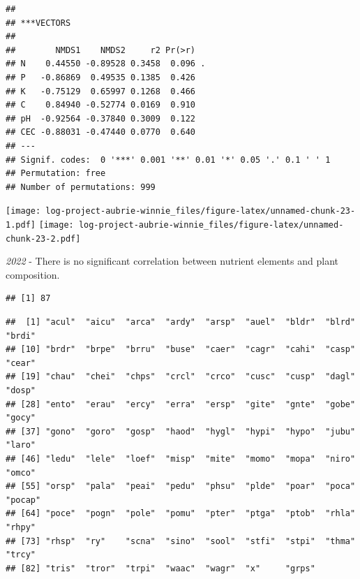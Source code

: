 \documentclass[
]{article}
\begin{document}
\begin{verbatim}
## 
## ***VECTORS
## 
##        NMDS1    NMDS2     r2 Pr(>r)  
## N    0.44550 -0.89528 0.3458  0.096 .
## P   -0.86869  0.49535 0.1385  0.426  
## K   -0.75129  0.65997 0.1268  0.466  
## C    0.84940 -0.52774 0.0169  0.910  
## pH  -0.92564 -0.37840 0.3009  0.122  
## CEC -0.88031 -0.47440 0.0770  0.640  
## ---
## Signif. codes:  0 '***' 0.001 '**' 0.01 '*' 0.05 '.' 0.1 ' ' 1
## Permutation: free
## Number of permutations: 999
\end{verbatim}

\texttt{[image: log-project-aubrie-winnie\_files/figure-latex/unnamed-chunk-23-1.pdf]}
\texttt{[image: log-project-aubrie-winnie\_files/figure-latex/unnamed-chunk-23-2.pdf]}

\emph{2022} - There is no significant correlation between nutrient
elements and plant composition.

\begin{verbatim}
## [1] 87
\end{verbatim}

\begin{verbatim}
##  [1] "acul"  "aicu"  "arca"  "ardy"  "arsp"  "auel"  "bldr"  "blrd"  "brdi" 
## [10] "brdr"  "brpe"  "brru"  "buse"  "caer"  "cagr"  "cahi"  "casp"  "cear" 
## [19] "chau"  "chei"  "chps"  "crcl"  "crco"  "cusc"  "cusp"  "dagl"  "dosp" 
## [28] "ento"  "erau"  "ercy"  "erra"  "ersp"  "gite"  "gnte"  "gobe"  "gocy" 
## [37] "gono"  "goro"  "gosp"  "haod"  "hygl"  "hypi"  "hypo"  "jubu"  "laro" 
## [46] "ledu"  "lele"  "loef"  "misp"  "mite"  "momo"  "mopa"  "niro"  "omco" 
## [55] "orsp"  "pala"  "peai"  "pedu"  "phsu"  "plde"  "poar"  "poca"  "pocap"
## [64] "poce"  "pogn"  "pole"  "pomu"  "pter"  "ptga"  "ptob"  "rhla"  "rhpy" 
## [73] "rhsp"  "ry"    "scna"  "sino"  "sool"  "stfi"  "stpi"  "thma"  "trcy" 
## [82] "tris"  "tror"  "trpi"  "waac"  "wagr"  "x"     "grps"
\end{verbatim}
\end{document}
